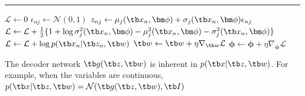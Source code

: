 \documentclass{article}
\begin{document}
        \begin{algorithm}[H]\label{alg:VAEtrain}
            \DontPrintSemicolon
            
            \caption{Variational autoencoder training algorithm}


            \BlankLine
            \hrule

            {
                {
                    $\mathcal{L} \leftarrow 0$\;
                    {
                        $\epsilon_{nj} \leftarrow \mathcal{N}(0,1)$\;
                        $z_{nj} \leftarrow \mu_j(\tb x_n, \bm\phi) + \sigma_j(\tb x_n,\bm\phi)\epsilon_{nj}$\;
                        $\mathcal{L} \leftarrow \mathcal{L} + \frac{1}{2}\{1+\log{\sigma^2_j(\tb x_n,\bm\phi)-\mu_j^2(\tb x_n,\bm\phi)-\sigma^2_j(\tb x_n,\bm\phi)}\}$\;
                    }
                    $\mathcal{L} \leftarrow \mathcal{L} + \log{p(\tb x_n|\tb z_n,\tb w)}$\;
                    $\tb w \leftarrow \tb w + \eta\nabla_{\tb w}\mathcal{L}$\;
                    $\bm\phi \leftarrow \bm\phi + \eta\nabla_{\bm\phi}\mathcal{L}$\;
                }
            }
        \end{algorithm}
        The decoder network $\tb g(\tb z, \tb w)$ is inherent in $p(\tb x|\tb z,\tb w)$. For example, when the variables are continuous, $p(\tb x|\tb z, \tb w)=\mathcal{N}(\tb g(\tb z, \tb w), \tb I)$
        
\end{document}
